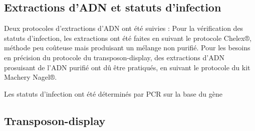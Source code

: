 
\subsection{Extractions d'ADN et statuts d'infection} %
	Deux protocoles d'extractions d'ADN ont été suivies : 
	Pour la vérification des statuts d'infection, les extractions ont été faites en suivant le protocole Chelex®, méthode peu coûteuse mais produisant un mélange non purifié.
	Pour les besoins en précision du protocole du transposon-display, des extractions d'ADN prosuisant de l'ADN purifié ont dû être pratiqués, en suivant le protocole du kit Machery Nagel®.

	Les statuts d'infection ont été déterminés par PCR sur la base du gène 

\subsection{Transposon-display} %
\label{sub:transposon_display}


